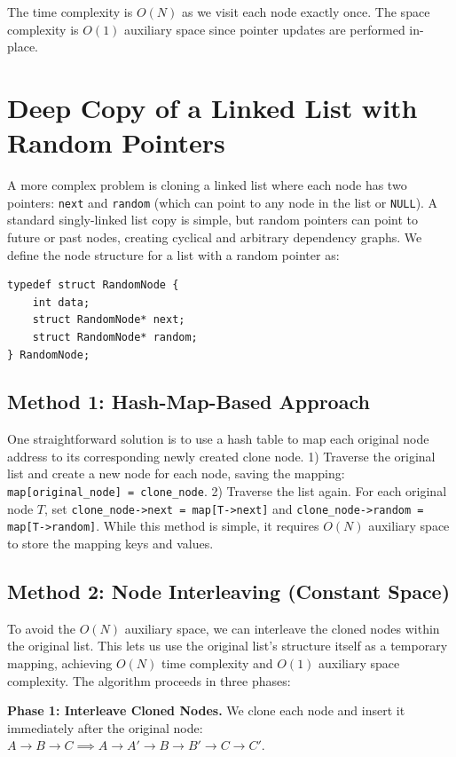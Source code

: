 \documentclass[10pt,journal,compsoc]{IEEEtran}
\begin{document}
The time complexity is $O(N)$ as we visit each node exactly once. The space complexity is $O(1)$ auxiliary space since pointer updates are performed in-place.

\section{Deep Copy of a Linked List with Random Pointers}
A more complex problem is cloning a linked list where each node has two pointers: \texttt{next} and \texttt{random} (which can point to any node in the list or \texttt{NULL}). A standard singly-linked list copy is simple, but random pointers can point to future or past nodes, creating cyclical and arbitrary dependency graphs. We define the node structure for a list with a random pointer as:

\begin{verbatim}
typedef struct RandomNode {
    int data;
    struct RandomNode* next;
    struct RandomNode* random;
} RandomNode;
\end{verbatim}

\subsection{Method 1: Hash-Map-Based Approach}
One straightforward solution is to use a hash table to map each original node address to its corresponding newly created clone node.
1) Traverse the original list and create a new node for each node, saving the mapping: \texttt{map[original\_node] = clone\_node}.
2) Traverse the list again. For each original node $T$, set \texttt{clone\_node->next = map[T->next]} and \texttt{clone\_node->random = map[T->random]}.
While this method is simple, it requires $O(N)$ auxiliary space to store the mapping keys and values.

\subsection{Method 2: Node Interleaving (Constant Space)}
To avoid the $O(N)$ auxiliary space, we can interleave the cloned nodes within the original list. This lets us use the original list's structure itself as a temporary mapping, achieving $O(N)$ time complexity and $O(1)$ auxiliary space complexity. The algorithm proceeds in three phases:

\textbf{Phase 1: Interleave Cloned Nodes.} We clone each node and insert it immediately after the original node:
$A \to B \to C \implies A \to A' \to B \to B' \to C \to C'$.
\end{document}
